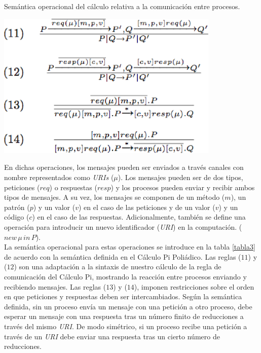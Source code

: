 \begin{table}
\vspace{2.4in}
\caption{Sem\'antica operacional del c\'alculo relativa a la comunicaci\'on entre procesos.}
\includegraphics[width=0.8\textwidth]{tabla3}
\label{tabla3}
\end{table}

En dichas operaciones, los mensajes pueden ser enviados a trav\'es canales con nombre representados como \textit{URIs} ($\mu$). Los mensajes pueden ser de dos tipos, peticiones ($req$) o respuestas ($resp$) y los procesos pueden enviar y recibir ambos tipos de mensajes. A su vez, los mensajes se componen de un m\'etodo ($m$), un patr\'on ($p$) y un valor ($v$) en el caso de las peticiones y de un valor ($v$) y un c\'odigo ($c$) en el caso de las respuestas. Adicionalmente, tambi\'en se define una operaci\'on para introducir un nuevo identificador (\textit{URI}) en la computaci\'on. ($new\, \mu\, in\,P$).\\
La sem\'antica operacional para estas operaciones se introduce en la tabla \ref{tabla3} de acuerdo con la sem\'antica definida en el C\'alculo Pi Poli\'adico. Las reglas ($11$) y ($12$) son una adaptaci\'on a la sintaxis de nuestro c\'alculo de la regla de comunicaci\'on del C\'alculo Pi, mostrando la reacci\'on entre procesos enviando y recibiendo mensajes. Las reglas ($13$) y ($14$), imponen restricciones sobre el orden en que peticiones y respuestas deben ser intercambiados. Seg\'un la sem\'antica definida, sin un proceso env\'ia un mensaje con una petici\'on a otro proceso, debe esperar un mensaje con una respuesta  tras un n\'umero finito de reducciones a trav\'es del mismo \textit{URI}. De modo sim\'etrico, si un proceso recibe una petici\'on a trav\'es de un \textit{URI} debe enviar una respuesta tras un cierto n\'umero de reducciones.\\

